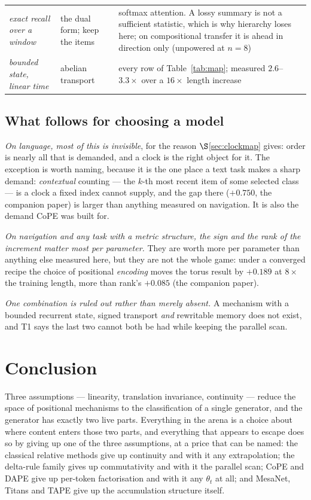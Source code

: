 \documentclass[11pt]{article}
\begin{document}
\begin{table}[htbp]
\begin{tabular}{@{}p{4.0cm}p{3.4cm}p{6.6cm}@{}}
\emph{exact recall over a window} & the dual form; keep the items & softmax attention. A lossy summary is not a sufficient statistic, which is why hierarchy loses here; on compositional transfer it is ahead in direction only (unpowered at $n=8$) \\[3pt]
\emph{bounded state, linear time} & abelian transport & every row of Table~\ref{tab:map}; measured $2.6$--$3.3\times$ over a $16\times$ length increase \\
\bottomrule
\end{tabular}
\end{table}

\subsection{What follows for choosing a model}

\emph{On language, most of this is invisible}, for the reason
$\S$\ref{sec:clockmap} gives: order is nearly all that is demanded, and a clock is the
right object for it. The exception is worth naming, because it is the one place a
text task makes a sharp demand: \emph{contextual} counting --- the $k$-th most
recent item of some selected class --- is a clock a fixed index cannot supply, and
the gap there ($+0.750$, the companion paper) is larger than anything measured
on navigation. It is also the demand CoPE was built for.

\emph{On navigation and any task with a metric structure, the sign and the rank
of the increment matter most per parameter.} They are worth more per parameter than
anything else measured here, but they are not the whole game: under a converged
recipe the choice of positional \emph{encoding} moves the torus result by $+0.189$ at
$8\times$ the training length, more than rank's $+0.085$ (the companion paper).

\emph{One combination is ruled out rather than merely absent.} A mechanism with a
bounded recurrent state, signed transport \emph{and} rewritable memory does not exist,
and T1 says the last two cannot both be had while keeping the parallel scan.


\section{Conclusion}

Three assumptions --- linearity, translation invariance, continuity --- reduce the
space of positional mechanisms to the classification of a single generator, and the
generator has exactly two live parts. Everything in the arena is a choice about
where content enters those two parts, and everything that appears to escape does so
by giving up one of the three assumptions, at a price that can be named: the
classical relative methods give up continuity and with it any extrapolation; the
delta-rule family gives up commutativity and with it the parallel scan; CoPE and DAPE
give up per-token factorisation and with it any $\theta_t$ at all; and MesaNet,
Titans and TAPE give up the accumulation structure itself.
\end{document}
